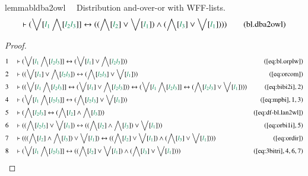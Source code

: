 \begin{restatable}{lemma}{bldba2owl}~~ Distribution and-over-or with WFF-lists.
\begin{align}
\vdash ( \bigvee[ \mwl{l_1} \bigwedge[ \mwl{l_2} \mwl{l_3} ] ] \leftrightarrow
    ( ( \bigwedge[ \mwl{l_2} ] \vee \bigvee[ \mwl{l_1} ] ) \wedge ( \bigwedge[
    \mwl{l_3} ] \vee \bigvee[ \mwl{l_1} ] ) )
    )\label{eq:bl.dba2owl}\tag{bl.dba2owl}
\end{align}
\end{restatable}

\begin{proof}
\begin{align}
  1 &&  & \vdash ( \bigvee[ \mwl{l_1} \bigwedge[ \mwl{l_2} \mwl{l_3} ] ]
      \leftrightarrow ( \bigvee[ \mwl{l_1} ] \vee
      \bigwedge[ \mwl{l_2} \mwl{l_3} ] )
      )&(\mbox{\ref{eq:bl.orplw}})\notag
  \\ 2 &&  & \vdash ( ( \bigvee[ \mwl{l_1} ] \vee \bigwedge[ \mwl{l_2}
      \mwl{l_3} ] ) \leftrightarrow ( \bigwedge[ \mwl{l_2}
      \mwl{l_3} ] \vee \bigvee[ \mwl{l_1} ] )
      )&(\mbox{\ref{eq:orcom}})\notag
  \\ 3 &&  & \vdash ( ( \bigvee[ \mwl{l_1} \bigwedge[ \mwl{l_2} \mwl{l_3} ] ]
      \leftrightarrow ( \bigvee[ \mwl{l_1} ] \vee
      \bigwedge[ \mwl{l_2} \mwl{l_3} ] ) ) \leftrightarrow
      ( \bigvee[ \mwl{l_1} \bigwedge[ \mwl{l_2} \mwl{l_3} ]
      ] \leftrightarrow ( \bigwedge[ \mwl{l_2} \mwl{l_3} ]
      \vee \bigvee[ \mwl{l_1} ] ) )
      )&(\mbox{\ref{eq:bibi2i}},2)\notag
  \\ 4 &&  & \vdash ( \bigvee[ \mwl{l_1} \bigwedge[ \mwl{l_2} \mwl{l_3} ] ]
      \leftrightarrow ( \bigwedge[ \mwl{l_2} \mwl{l_3} ]
      \vee \bigvee[ \mwl{l_1} ] )
      )&(\mbox{\ref{eq:mpbi}},1,3)\notag
  \\ 5 &&  & \vdash ( \bigwedge[ \mwl{l_2} \mwl{l_3} ] \leftrightarrow (
      \bigwedge[ \mwl{l_2} ] \wedge \bigwedge[ \mwl{l_3} ]
      ) )&(\mbox{\ref{eq:df-bl.lan2wl}})\notag
  \\ 6 &&  & \vdash ( ( \bigwedge[ \mwl{l_2} \mwl{l_3} ] \vee \bigvee[
      \mwl{l_1} ] ) \leftrightarrow ( ( \bigwedge[
      \mwl{l_2} ] \wedge \bigwedge[ \mwl{l_3} ] ) \vee
      \bigvee[ \mwl{l_1} ] )
      )&(\mbox{\ref{eq:orbi1i}},5)\notag
  \\ 7 &&  & \vdash ( ( ( \bigwedge[ \mwl{l_2} ] \wedge \bigwedge[ \mwl{l_3} ]
      ) \vee \bigvee[ \mwl{l_1} ] ) \leftrightarrow ( (
      \bigwedge[ \mwl{l_2} ] \vee \bigvee[ \mwl{l_1} ] )
      \wedge ( \bigwedge[ \mwl{l_3} ] \vee \bigvee[
      \mwl{l_1} ] ) ) )&(\mbox{\ref{eq:ordir}})\notag
  \\ 8 &&  & \vdash ( \bigvee[ \mwl{l_1} \bigwedge[ \mwl{l_2} \mwl{l_3} ] ]
      \leftrightarrow ( ( \bigwedge[ \mwl{l_2} ] \vee
      \bigvee[ \mwl{l_1} ] ) \wedge ( \bigwedge[ \mwl{l_3}
      ] \vee \bigvee[ \mwl{l_1} ] ) )
      )&(\mbox{\ref{eq:3bitri}},4,6,7)\notag
\end{align}
\end{proof}

